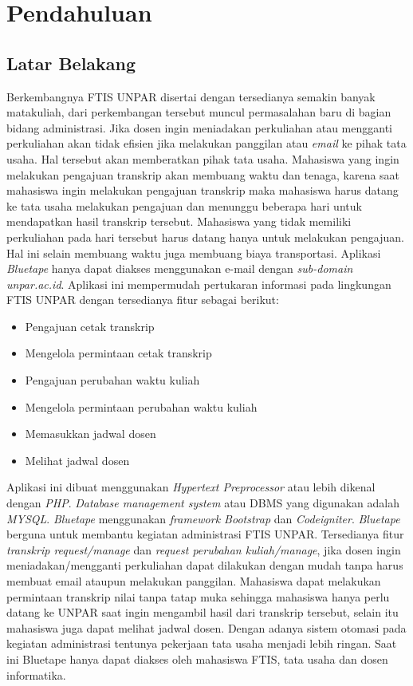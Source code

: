 \chapter{Pendahuluan}
\label{chap:intro}
   
\section{Latar Belakang}
\label{sec:label}
 Berkembangnya FTIS UNPAR disertai dengan tersedianya semakin banyak matakuliah, dari perkembangan tersebut muncul permasalahan baru di bagian bidang administrasi. Jika dosen ingin meniadakan perkuliahan atau mengganti perkuliahan akan tidak efisien jika melakukan panggilan atau \textit{email} ke pihak tata usaha. Hal tersebut akan memberatkan pihak tata usaha. Mahasiswa yang ingin melakukan pengajuan transkrip akan membuang waktu dan tenaga, karena saat mahasiswa ingin melakukan pengajuan transkrip maka mahasiswa harus datang ke tata usaha melakukan pengajuan dan menunggu beberapa hari untuk mendapatkan hasil transkrip tersebut. Mahasiswa yang tidak memiliki perkuliahan pada hari tersebut harus datang hanya untuk melakukan pengajuan. Hal ini selain membuang waktu juga membuang biaya transportasi. Aplikasi \textit{Bluetape} hanya dapat diakses menggunakan e-mail dengan \textit{sub-domain unpar.ac.id}. Aplikasi ini mempermudah pertukaran informasi pada lingkungan FTIS UNPAR dengan tersedianya fitur sebagai berikut:
 \begin{itemize}
 	\item Pengajuan cetak transkrip
 	\item Mengelola permintaan cetak transkrip
 	\item Pengajuan perubahan waktu kuliah
 	\item Mengelola permintaan perubahan waktu kuliah
 	\item Memasukkan jadwal dosen
 	\item Melihat jadwal dosen
 \end{itemize}

Aplikasi ini dibuat menggunakan \textit{Hypertext Preprocessor} atau lebih dikenal dengan \textit{PHP}. \textit{Database management system} atau DBMS yang digunakan adalah \textit{MYSQL}. \textit{ Bluetape} menggunakan \textit{framework Bootstrap} dan \textit{Codeigniter}. \textit{Bluetape} berguna untuk membantu kegiatan administrasi FTIS UNPAR. Tersedianya fitur \textit{transkrip request/manage} dan \textit{request perubahan kuliah/manage}, jika dosen ingin meniadakan/mengganti perkuliahan dapat dilakukan dengan mudah tanpa harus membuat email ataupun melakukan panggilan. Mahasiswa dapat melakukan permintaan transkrip nilai tanpa tatap muka sehingga mahasiswa hanya perlu datang ke UNPAR saat ingin mengambil hasil dari transkrip tersebut, selain itu mahasiswa juga dapat melihat jadwal dosen. Dengan adanya sistem otomasi pada kegiatan administrasi tentunya pekerjaan tata usaha menjadi lebih ringan. Saat ini Bluetape hanya dapat diakses oleh mahasiswa FTIS, tata usaha dan dosen informatika.  



